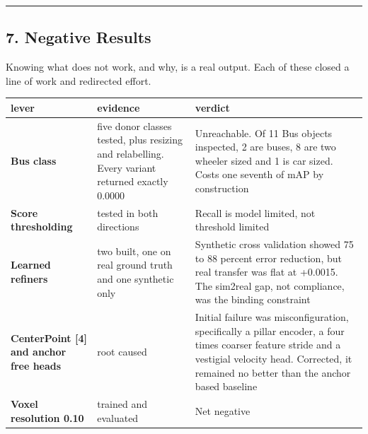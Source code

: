 \documentclass[
  10pt,
]{article}
\newcounter{none} %
\begin{document}
\begin{center}\rule{0.5\linewidth}{0.5pt}\end{center}

\subsection{7. Negative Results}\label{negative-results}

Knowing what does not work, and why, is a real output. Each of these
closed a line of work and redirected effort.

{\def\LTcaptype{none} %
\begin{longtable}[]{@{}
  >{\raggedright\arraybackslash}p{}
  >{\raggedright\arraybackslash}p{}
  >{\raggedright\arraybackslash}p{}@{}}
\toprule\noalign{}
\begin{minipage}[b]{\linewidth}\raggedright
lever
\end{minipage} & \begin{minipage}[b]{\linewidth}\raggedright
evidence
\end{minipage} & \begin{minipage}[b]{\linewidth}\raggedright
verdict
\end{minipage} \\
\midrule\noalign{}
\endhead
\bottomrule\noalign{}
\endlastfoot
\textbf{Bus class} & five donor classes tested, plus resizing and
relabelling. Every variant returned exactly 0.0000 & Unreachable. Of 11
Bus objects inspected, 2 are buses, 8 are two wheeler sized and 1 is car
sized. Costs one seventh of mAP by construction \\
\textbf{Score thresholding} & tested in both directions & Recall is
model limited, not threshold limited \\
\textbf{Learned refiners} & two built, one on real ground truth and one
synthetic only & Synthetic cross validation showed 75 to 88 percent
error reduction, but real transfer was flat at +0.0015. The sim2real
gap, not compliance, was the binding constraint \\
\textbf{CenterPoint {[}4{]} and anchor free heads} & root caused &
Initial failure was misconfiguration, specifically a pillar encoder, a
four times coarser feature stride and a vestigial velocity head.
Corrected, it remained no better than the anchor based baseline \\
\textbf{Voxel resolution 0.10} & trained and evaluated & Net negative

\end{longtable}}
\end{document}
